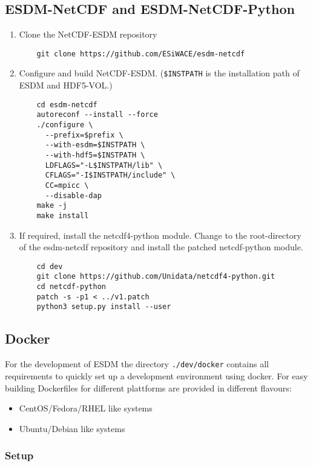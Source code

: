 \subsection{ESDM-NetCDF and ESDM-NetCDF-Python}%
\begin{enumerate}
  \item Clone the NetCDF-ESDM repository
    \begin{lstlisting}
    git clone https://github.com/ESiWACE/esdm-netcdf
    \end{lstlisting}
  \item Configure and build NetCDF-ESDM. (\lstinline|$INSTPATH| is the installation path of ESDM and HDF5-VOL.)
    \begin{lstlisting}
    cd esdm-netcdf
    autoreconf --install --force
    ./configure \
      --prefix=$prefix \
      --with-esdm=$INSTPATH \
      --with-hdf5=$INSTPATH \
      LDFLAGS="-L$INSTPATH/lib" \
      CFLAGS="-I$INSTPATH/include" \
      CC=mpicc \
      --disable-dap
    make -j
    make install
    \end{lstlisting}
  \item If required, install the netcdf4-python module. 
    Change to the root-directory of the esdm-netcdf repository and install the patched netcdf-python module.
    \begin{lstlisting}
    cd dev
    git clone https://github.com/Unidata/netcdf4-python.git
    cd netcdf-python
    patch -s -p1 < ../v1.patch
    python3 setup.py install --user
    \end{lstlisting}
\end{enumerate}

\subsection{Docker}
For the development of ESDM the directory \lstinline|./dev/docker| contains all requirements to quickly set up a development environment using docker.
For easy building Dockerfiles for different plattforms are provided in different flavours:

\begin{itemize}
  \item CentOS/Fedora/RHEL like systems
  \item Ubuntu/Debian like systems
\end{itemize}

\subsubsection{Setup}

